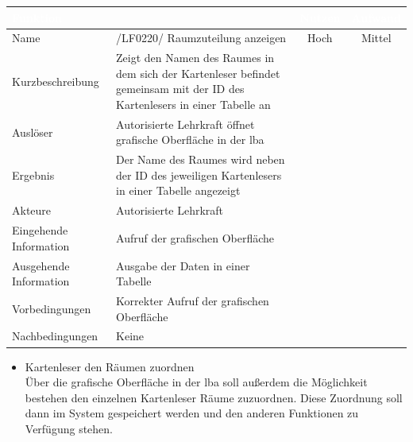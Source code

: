 \begin{flushright}
    \begin{tabular}{| A{3cm}  A{6.5cm} | c | c |}
        \hline {} \textbf{\textcolor{white}{Funktion}} && \textbf{\textcolor{white}{Nutzen}} & \textbf{\textcolor{white}{Aufwand}}\\
        \hline \hline
        Name & /LF0220/ Raumzuteilung anzeigen & Hoch & Mittel \\
        Kurzbeschreibung & Zeigt den Namen des Raumes in dem sich der Kartenleser befindet gemeinsam mit der ID des Kartenlesers in einer Tabelle an &&  \\
        Auslöser & Autorisierte Lehrkraft öffnet grafische Oberfläche in der \gls{lba} &&  \\
        Ergebnis & Der Name des Raumes wird neben der ID des jeweiligen Kartenlesers in einer Tabelle angezeigt &&  \\
        Akteure & Autorisierte Lehrkraft &&  \\
        Eingehende $   $Information & Aufruf der grafischen Oberfläche &&  \\
        Ausgehende  Information & Ausgabe der Daten in einer Tabelle &&  \\
        Vorbedingungen & Korrekter Aufruf der grafischen Oberfläche &&  \\
        Nachbedingungen & Keine  &&  \\
        \hline
    \end{tabular}
\end{flushright}
\newpage
\begin{itemize}[leftmargin=1.0in]
    \item [\lf] Kartenleser den Räumen zuordnen \\
        Über die grafische Oberfläche in der \gls{lba} soll außerdem die Möglichkeit bestehen den einzelnen Kartenleser Räume zuzuordnen. Diese Zuordnung soll dann im System gespeichert werden und den anderen Funktionen zu Verfügung stehen.
\end{itemize}

